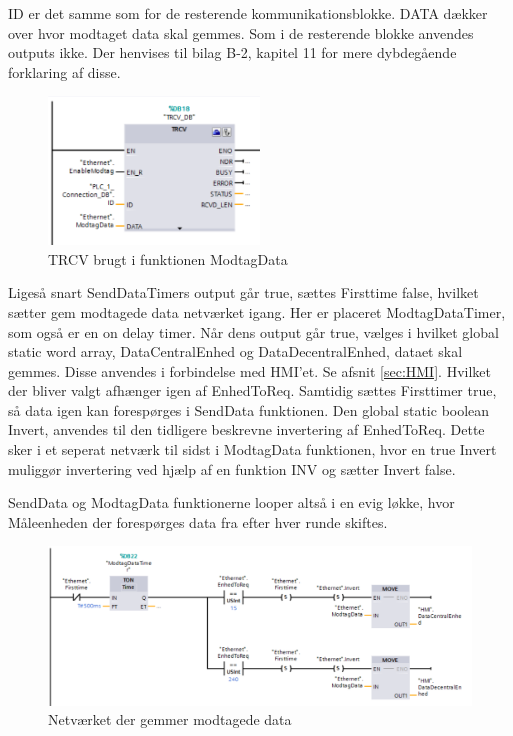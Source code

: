 ID er det samme som for de resterende kommunikationsblokke. DATA dækker over hvor modtaget data skal gemmes. Som i de resterende blokke anvendes outputs ikke. Der henvises til bilag B-2, kapitel 11 for mere dybdegående forklaring af disse.

\begin{figure}[H] %
	\centering
	\includegraphics[width=0.5\textwidth]{Figure/TRCV}
	\caption{TRCV brugt i funktionen ModtagData}
	\label{fig:TRCV}
\end{figure}

Ligeså snart SendDataTimers output går true, sættes Firsttime false, hvilket sætter gem modtagede data netværket igang. Her er placeret ModtagDataTimer, som også er en on delay timer. Når dens output går true, vælges i hvilket global static word array, DataCentralEnhed og DataDecentralEnhed, dataet skal gemmes. Disse anvendes i forbindelse med HMI'et. Se afsnit \ref{sec:HMI}. Hvilket der bliver valgt afhænger igen af EnhedToReq. Samtidig sættes Firsttimer true, så data igen kan forespørges i SendData funktionen. Den global static boolean Invert, anvendes til den tidligere beskrevne invertering af EnhedToReq. Dette sker i et seperat netværk til sidst i ModtagData funktionen, hvor en true Invert muliggør invertering ved hjælp af en funktion INV og sætter Invert false.

SendData og ModtagData funktionerne looper altså i en evig løkke, hvor Måleenheden der forespørges data fra efter hver runde skiftes.

\begin{figure}[H] %
	\centering
	\includegraphics[width=1\textwidth]{Figure/GemModtagetData}
	\caption{Netværket der gemmer modtagede data}
	\label{fig:GemModtagetdata}
\end{figure}

